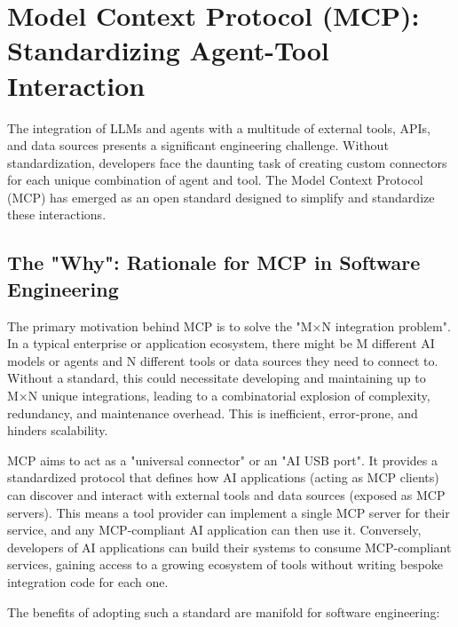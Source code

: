 \chapter{Model Context Protocol (MCP): Standardizing Agent-Tool Interaction}

The integration of LLMs and agents with a multitude of external tools, APIs, and data sources presents a significant engineering challenge. 
Without standardization, developers face the daunting task of creating custom connectors for each unique combination of agent and tool. 
The Model Context Protocol (MCP) has emerged as an open standard designed to simplify and standardize these interactions.

\section{The "Why": Rationale for MCP in Software Engineering}

The primary motivation behind MCP is to solve the "M×N integration problem". In a typical enterprise or application ecosystem, 
there might be M different AI models or agents and N different tools or data sources they need to connect to. Without a standard, 
this could necessitate developing and maintaining up to M×N unique integrations, leading to a combinatorial explosion of complexity,
 redundancy, and maintenance overhead. This is inefficient, error-prone, and hinders scalability.

MCP aims to act as a "universal connector" or an "AI USB port". It provides a standardized protocol that defines how AI applications 
(acting as MCP clients) can discover and interact with external tools and data sources (exposed as MCP servers). This means a 
tool provider can implement a single MCP server for their service, and any MCP-compliant AI application can then use it. 
Conversely, developers of AI applications can build their systems to consume MCP-compliant services, gaining access to a growing
 ecosystem of tools without writing bespoke integration code for each one.

The benefits of adopting such a standard are manifold for software engineering:

